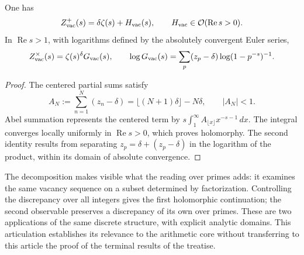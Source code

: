 \begin{proposition}
One has
\[
 Z_{\rm vac}^{+}(s)=\delta\zeta(s)+H_{\rm vac}(s),
 \qquad H_{\rm vac}\in\mathcal O(\operatorname{Re}s>0).
\]
In \(\operatorname{Re}s>1\), with logarithms defined by the absolutely
convergent Euler series,
\[
 Z_{\rm vac}^{\times}(s)=\zeta(s)^\delta G_{\rm vac}(s),\qquad
 \log G_{\rm vac}(s)=
 \sum_p(z_p-\delta)\log(1-p^{-s})^{-1}.
\]
\end{proposition}
\begin{proof}
The centered partial sums satisfy
\[
 A_N:=\sum_{n=1}^N(z_n-\delta)
 =\lfloor(N+1)\delta\rfloor-N\delta,\qquad |A_N|<1.
\]
Abel summation represents the centered term by
\(s\int_1^\infty A_{\lfloor x\rfloor}x^{-s-1}\,dx\). The integral
converges locally uniformly in \(\operatorname{Re}s>0\),
which proves holomorphy. The second identity results from separating
\(z_p=\delta+(z_p-\delta)\) in the logarithm of the product, within
its domain of absolute convergence.
\end{proof}

The decomposition makes visible what the reading over primes adds: it
examines the same vacancy sequence on a subset determined by
factorization. Controlling the discrepancy over all integers gives
the first holomorphic continuation; the second observable preserves a
discrepancy of its own over primes. These are two applications of the same
discrete structure, with explicit analytic domains. This articulation
establishes its relevance to the arithmetic core without transferring to
this article the proof of the terminal results of the treatise.
